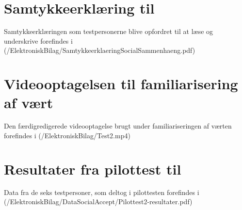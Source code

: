 \section{Samtykkeerklæring til }
\label{app:SamtykkeerklaeringSocialAccept}
%
Samtykkeerklæringen som testpersonerne blive opfordret til at læse og underskrive forefindes i (/ElektroniskBilag/SamtykkeerklaeringSocialSammenhaeng.pdf)
%
\section{Videooptagelsen til familiarisering af vært}
\label{app:VideooptagelseFam}
%
Den færdigredigerede videooptagelse brugt under familiariseringen af værten forefindes i (/ElektroniskBilag/Test2.mp4)
%
\section{Resultater fra pilottest til }
\label{app:ResultaterPilottestSocialAccept}
%
Data fra de seks testpersoner, som deltog i pilottesten forefindes i \\
(/ElektroniskBilag/DataSocialAccept/Pilottest2-resultater.pdf)
%
